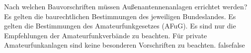     {Nach welchen Bauvorschriften müssen Außenantennenanlagen errichtet werden?}
    {Es gelten die baurechtlichen Bestimmungen des jeweiligen Bundeslandes.}
    {Es gelten die Bestimmungen des Amateurfunkgesetzes (AFuG).}
    {Es sind nur die Empfehlungen der Amateurfunkverbände zu beachten.}
    {Für private Amateurfunkanlagen sind keine besonderen Vorschriften zu beachten.}
    {false}{false}